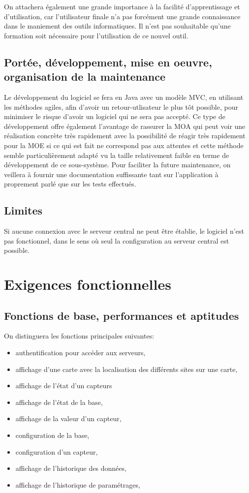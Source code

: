 On attachera également une grande importance à la facilité d'apprentissage et d'utilisation, car l'utilisateur finale n'a pas forcément une grande connaissance dans le maniement des outils informatiques. Il n'est pas souhaitable qu'une formation soit nécessaire pour l'utilisation de ce nouvel outil.

\subsection{Portée, développement, mise en oeuvre, organisation de la maintenance}
Le développement du logiciel se fera en Java avec un modèle MVC, en utilisant les méthodes agiles, afin d'avoir un retour-utlisateur le plus tôt possible, pour minimiser le risque d'avoir un logiciel qui ne sera pas accepté. Ce type de développement offre également l'avantage de rassurer la MOA qui peut voir une réalisation concrète très rapidement avec la possibilité de réagir très rapidement pour la MOE si ce qui est fait ne correspond pas aux attentes et cette méthode semble particulièrement adapté vu la taille relativement faible en terme de développement de ce sous-système. 
Pour faciliter la future maintenance, on veillera à fournir une documentation suffissante tant sur l'application à proprement parlé que sur les tests effectués.

\subsection{Limites}
Si aucune connexion avec le serveur central ne peut être établie, le logiciel n'est pas fonctionnel, dans le sens où seul la configuration au serveur central est possible.

\section{Exigences fonctionnelles}
\subsection{Fonctions de base, performances et aptitudes}
On distinguera les fonctions principales suivantes:
\begin{itemize}
	\item authentification pour accéder aux serveurs,
	\item affichage d'une carte avec la localisation des différents sites sur une carte,
	\item affichage de l'état d'un capteurs
	\item affichage de l'état de la base,
	\item affichage de la valeur d'un capteur,
	\item configuration de la base,
	\item configuration d'un capteur,
	\item affichage de l'historique des données,
	\item affichage de l'historique de paramétrages,
\end{itemize}

